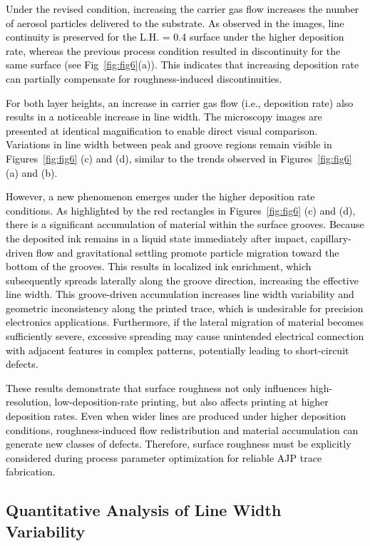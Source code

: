 \documentclass[subscriptcorrection,upint,varvw,balance,hyphenate]{asmejour}
\newcommand{\rev}[1]{\textcolor{black}{#1\xspace}}
\begin{document}
\rev{Under the revised condition, increasing the carrier gas flow increases the number of aerosol particles delivered to the substrate. As observed in the images, line continuity is preserved for the L.H. = 0.4 surface under the higher deposition rate, whereas the previous process condition resulted in discontinuity for the same surface (see Fig~\ref{fig:fig6}(a)). This indicates that increasing deposition rate can partially compensate for roughness-induced discontinuities.}

\rev{For both layer heights, an increase in carrier gas flow (i.e., deposition rate) also results in a noticeable increase in line width. The microscopy images are presented at identical magnification to enable direct visual comparison. Variations in line width between peak and groove regions remain visible in Figures~\ref{fig:fig6} (c) and (d), similar to the trends observed in Figures~\ref{fig:fig6} (a) and (b).}

\rev{However, a new phenomenon emerges under the higher deposition rate conditions. As highlighted by the red rectangles in Figures~\ref{fig:fig6} (c) and (d), there is a significant accumulation of material within the surface grooves. Because the deposited ink remains in a liquid state immediately after impact, capillary-driven flow and gravitational settling promote particle migration toward the bottom of the grooves. This results in localized ink enrichment, which subsequently spreads laterally along the groove direction, increasing the effective line width. This groove-driven accumulation increases line width variability and geometric inconsistency along the printed trace, which is undesirable for precision electronics applications. Furthermore, if the lateral migration of material becomes sufficiently severe, excessive spreading may cause unintended electrical connection with adjacent features in complex patterns, potentially leading to short-circuit defects.}

\rev{These results demonstrate that surface roughness not only influences high-resolution, low-deposition-rate printing, but also affects printing at higher deposition rates. Even when wider lines are produced under higher deposition conditions, roughness-induced flow redistribution and material accumulation can generate new classes of defects. Therefore, surface roughness must be explicitly considered during process parameter optimization for reliable AJP trace fabrication.}


\subsection{Quantitative Analysis of Line Width Variability}
\end{document}
